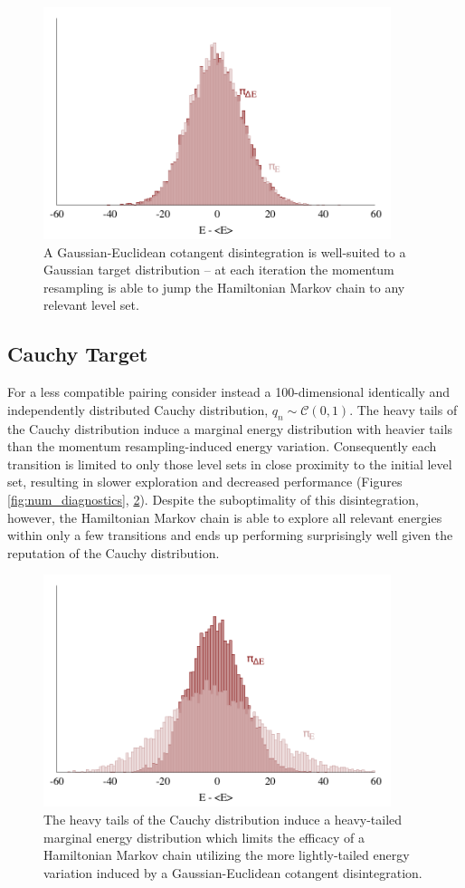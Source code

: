 \documentclass[stslayout]{imsart}
\begin{document}
\begin{figure}
\centering
\includegraphics[width=4in]{energy_gauss.png}
\caption{A Gaussian-Euclidean cotangent disintegration is well-suited
to a Gaussian target distribution -- at each iteration the momentum
resampling is able to jump the Hamiltonian Markov chain to any relevant
level set.}
\label{fig:gauss_exp}
\end{figure}

\subsection{Cauchy Target}

For a less compatible pairing consider instead a 100-dimensional identically 
and independently distributed Cauchy distribution, 
$q_{n} \sim \mathcal{C} \! \left( 0, 1 \right)$.  The heavy tails of the Cauchy
distribution induce a marginal energy distribution with heavier tails than
the momentum resampling-induced energy variation.  Consequently each 
transition is limited to only those level sets in close proximity to the initial 
level set, resulting in slower exploration and decreased performance 
(Figures \ref{fig:num_diagnostics}, \ref{fig:cauchy_exp}).  Despite the 
suboptimality of this disintegration, however, the Hamiltonian Markov chain 
is able to explore all relevant energies within only a few transitions and 
ends up performing surprisingly well given the reputation of the Cauchy 
distribution.

\begin{figure}
\centering
\includegraphics[width=4in]{energy_cauchy.png}
\caption{The heavy tails of the Cauchy distribution induce a heavy-tailed
marginal energy distribution which limits the efficacy of a Hamiltonian 
Markov chain utilizing the more lightly-tailed energy variation induced by a 
Gaussian-Euclidean cotangent disintegration.}
\label{fig:cauchy_exp}
\end{figure}
\end{document}
